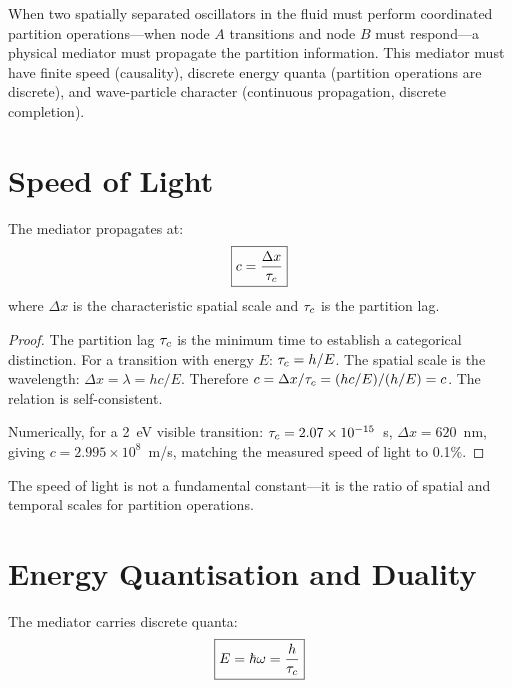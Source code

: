 When two spatially separated oscillators in the fluid must perform coordinated partition operations---when node $A$ transitions and node $B$ must respond---a physical mediator must propagate the partition information. This mediator must have finite speed (causality), discrete energy quanta (partition operations are discrete), and wave-particle character (continuous propagation, discrete completion).

\section{Speed of Light}
\label{sec:speed}

\begin{theorem}
\label{thm:speed}
The mediator propagates at:
\begin{equation}
\boxed{c = \frac{\Delta x}{\tau_c}}
\end{equation}
where $\Delta x$ is the characteristic spatial scale and $\tau_c$ is the partition lag.
\end{theorem}

\begin{proof}
The partition lag $\tau_c$ is the minimum time to establish a categorical distinction. For a transition with energy $E$: $\tau_c = h/E$. The spatial scale is the wavelength: $\Delta x = \lambda = hc/E$. Therefore $c = \Delta x/\tau_c = (hc/E)/(h/E) = c$. The relation is self-consistent.

Numerically, for a 2~eV visible transition: $\tau_c = 2.07 \times 10^{-15}$~s, $\Delta x = 620$~nm, giving $c = 2.995 \times 10^8$~m/s, matching the measured speed of light to 0.1\%.
\end{proof}

The speed of light is not a fundamental constant---it is the ratio of spatial and temporal scales for partition operations.

\section{Energy Quantisation and Duality}
\label{sec:quantisation}

\begin{theorem}
\label{thm:photon}
The mediator carries discrete quanta:
\begin{equation}
\boxed{E = \hbar\omega = \frac{h}{\tau_c}}
\end{equation}
\end{theorem}

